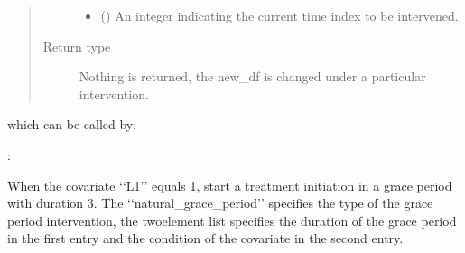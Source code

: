 \documentclass[letterpaper,10pt,english]{sphinxmanual}
\begin{document}
\begin{fulllineitems}
\begin{quote}
\begin{description}
\begin{itemize}
\item {} 
\sphinxAtStartPar
{} () \textendash{} An integer indicating the current time index to be intervened.

\end{itemize}

\item[{Return type}] \leavevmode
\sphinxAtStartPar
Nothing is returned, the new\_df is changed under a particular intervention.

\end{description}\end{quote}

\end{fulllineitems}


\sphinxAtStartPar
which can be called by:

\begin{sphinxVerbatim}[commandchars=\\\{\}]
   
\end{sphinxVerbatim}

\sphinxAtStartPar
{}:

\sphinxAtStartPar
When the covariate ‘‘L1’’ equals 1, start a treatment initiation in a grace period with duration 3. The ‘‘natural\_grace\_period’’
specifies the type of the grace period intervention, the two\sphinxhyphen{}element list specifies the duration of the grace period
in the first entry and the condition of the covariate in the second entry.

\begin{sphinxVerbatim}[commandchars=\\\{\}]
   

  \PYG{p}{[}\PYG{p}{]}

     
      \PYG{p}{[} \PYG{p}{[}      \PYG{p}{]}\PYG{p}{]} 
\end{sphinxVerbatim}
\end{document}
